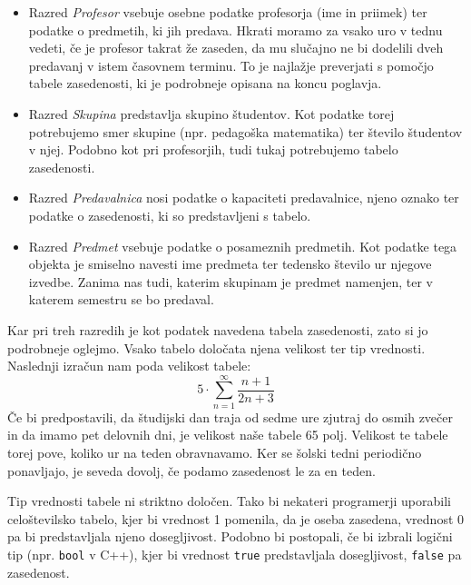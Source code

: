 \documentclass[a4paper]{article}
\begin{document}
   
   \begin{itemize}
      \item Razred \emph{Profesor} vsebuje osebne podatke profesorja (ime in priimek) ter
      podatke o predmetih, ki jih predava. Hkrati moramo za vsako uro v tednu vedeti, če
      je profesor takrat že zaseden, da mu slučajno ne bi dodelili dveh predavanj v istem
      časovnem terminu. To je najlažje preverjati s pomočjo tabele zasedenosti, ki je
      podrobneje opisana na koncu poglavja.
      \item Razred \emph{Skupina} predstavlja skupino študentov. Kot podatke torej potrebujemo
      smer skupine (npr. pedagoška matematika) ter število študentov v njej. Podobno kot pri
      profesorjih, tudi tukaj potrebujemo tabelo zasedenosti.
      \item Razred \emph{Predavalnica} nosi podatke o kapaciteti predavalnice, njeno oznako
      ter podatke o zasedenosti, ki so predstavljeni s tabelo.
   
      \item Razred \emph{Predmet} vsebuje podatke o posameznih predmetih. Kot podatke tega
      objekta je smiselno navesti ime predmeta ter tedensko število ur njegove izvedbe.
      Zanima nas tudi, katerim skupinam je predmet namenjen, ter v katerem semestru se bo
      predaval.
   \end{itemize}
%
Kar pri treh razredih je kot podatek navedena tabela zasedenosti, zato si jo podrobneje
oglejmo. Vsako tabelo določata njena velikost ter tip vrednosti. Naslednji izračun nam
poda velikost tabele:
$$5\cdot\sum_{n=1}^{\infty}\frac{n+1}{2n+3}$$
Če bi predpostavili, da študijski dan traja od sedme ure zjutraj do osmih zvečer in da
imamo pet delovnih dni, je velikost naše tabele 65 polj. Velikost te tabele torej pove,
koliko ur na teden obravnavamo. Ker se šolski tedni periodično ponavljajo, je seveda
dovolj, če podamo zasedenost le za en teden.


Tip vrednosti tabele ni striktno določen. Tako bi nekateri programerji uporabili
celoštevilsko tabelo, kjer bi vrednost 1 pomenila, da je oseba zasedena, vrednost 0
pa bi predstavljala njeno dosegljivost. Podobno bi postopali, če bi izbrali logični
tip (npr. \texttt{bool} v C++), kjer bi vrednost \texttt{true} predstavljala dosegljivost, {\tt false} pa zasedenost.
\end{document}
